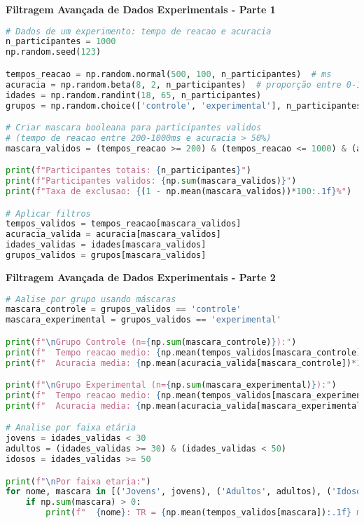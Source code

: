 \begin{examplebox}
\textbf{Filtragem Avançada de Dados Experimentais - Parte 1}

\begin{lstlisting}[language=Python]
# Dados de um experimento: tempo de reacao e acuracia
n_participantes = 1000
np.random.seed(123)

tempos_reacao = np.random.normal(500, 100, n_participantes)  # ms
acuracia = np.random.beta(8, 2, n_participantes)  # proporção entre 0-1
idades = np.random.randint(18, 65, n_participantes)
grupos = np.random.choice(['controle', 'experimental'], n_participantes)

# Criar mascara booleana para participantes validos
# (tempo de reacao entre 200-1000ms e acuracia > 50%)
mascara_validos = (tempos_reacao >= 200) & (tempos_reacao <= 1000) & (acuracia > 0.5)

print(f"Participantes totais: {n_participantes}")
print(f"Participantes validos: {np.sum(mascara_validos)}")
print(f"Taxa de exclusao: {(1 - np.mean(mascara_validos))*100:.1f}%")

# Aplicar filtros
tempos_validos = tempos_reacao[mascara_validos]
acuracia_valida = acuracia[mascara_validos]
idades_validas = idades[mascara_validos]
grupos_validos = grupos[mascara_validos]
\end{lstlisting}
\end{examplebox}

\begin{examplebox}
\textbf{Filtragem Avançada de Dados Experimentais - Parte 2}

\begin{lstlisting}[language=Python]
# Aalise por grupo usando máscaras
mascara_controle = grupos_validos == 'controle'
mascara_experimental = grupos_validos == 'experimental'

print(f"\nGrupo Controle (n={np.sum(mascara_controle)}):")
print(f"  Tempo reacao medio: {np.mean(tempos_validos[mascara_controle]):.1f} ms")
print(f"  Acuracia media: {np.mean(acuracia_valida[mascara_controle])*100:.1f}%")

print(f"\nGrupo Experimental (n={np.sum(mascara_experimental)}):")
print(f"  Tempo reacao medio: {np.mean(tempos_validos[mascara_experimental]):.1f} ms")
print(f"  Acuracia media: {np.mean(acuracia_valida[mascara_experimental])*100:.1f}%")

# Analise por faixa etária
jovens = idades_validas < 30
adultos = (idades_validas >= 30) & (idades_validas < 50)
idosos = idades_validas >= 50

print(f"\nPor faixa etaria:")
for nome, mascara in [('Jovens', jovens), ('Adultos', adultos), ('Idosos', idosos)]:
    if np.sum(mascara) > 0:
        print(f"  {nome}: TR = {np.mean(tempos_validos[mascara]):.1f} ms")
\end{lstlisting}
\end{examplebox}

